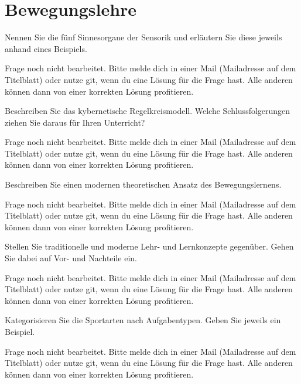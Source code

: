 \section{Bewegungslehre}

\begin{question}{5}
    Nennen Sie die fünf Sinnesorgane der Sensorik und erläutern Sie diese jeweils anhand eines Beispiels.
\end{question}
\begin{solution}
    Frage noch nicht bearbeitet. Bitte melde dich in einer Mail (Mailadresse auf dem Titelblatt) oder nutze git, wenn du eine Lösung für die Frage hast. Alle anderen können dann von einer korrekten Lösung profitieren.
\end{solution}

\begin{question}{6}
    Beschreiben Sie das kybernetische Regelkreismodell. Welche Schlussfolgerungen ziehen Sie daraus für Ihren Unterricht?
\end{question}
\begin{solution}
    Frage noch nicht bearbeitet. Bitte melde dich in einer Mail (Mailadresse auf dem Titelblatt) oder nutze git, wenn du eine Lösung für die Frage hast. Alle anderen können dann von einer korrekten Lösung profitieren.
\end{solution}

\begin{question}{6}
    Beschreiben Sie einen modernen theoretischen Ansatz des Bewegungslernens.
\end{question}
\begin{solution}
    Frage noch nicht bearbeitet. Bitte melde dich in einer Mail (Mailadresse auf dem Titelblatt) oder nutze git, wenn du eine Lösung für die Frage hast. Alle anderen können dann von einer korrekten Lösung profitieren.
\end{solution}

\begin{question}{6}
    Stellen Sie traditionelle und moderne Lehr- und Lernkonzepte gegenüber. Gehen Sie dabei auf Vor- und Nachteile ein.
\end{question}
\begin{solution}
    Frage noch nicht bearbeitet. Bitte melde dich in einer Mail (Mailadresse auf dem Titelblatt) oder nutze git, wenn du eine Lösung für die Frage hast. Alle anderen können dann von einer korrekten Lösung profitieren.
\end{solution}

\begin{question}{4}
    Kategorisieren Sie die Sportarten nach Aufgabentypen. Geben Sie jeweils ein Beispiel.
\end{question}
\begin{solution}
    Frage noch nicht bearbeitet. Bitte melde dich in einer Mail (Mailadresse auf dem Titelblatt) oder nutze git, wenn du eine Lösung für die Frage hast. Alle anderen können dann von einer korrekten Lösung profitieren.
\end{solution}

